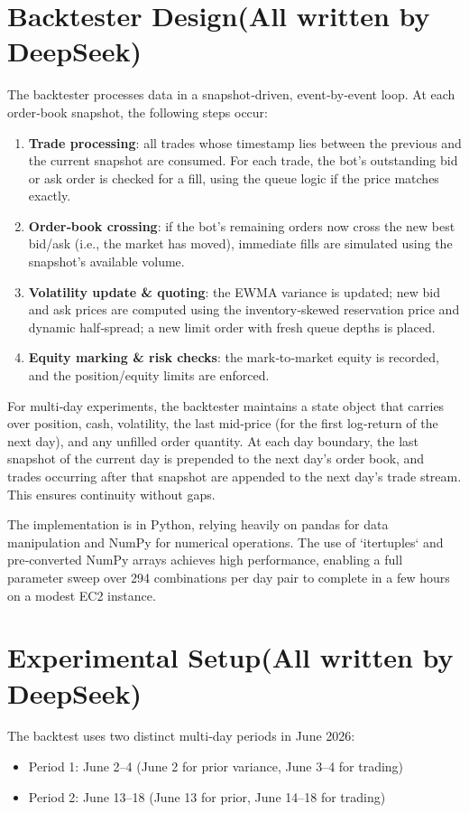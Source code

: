 \documentclass[11pt,a4paper]{article}
\begin{document}
\section{Backtester Design(All written by DeepSeek)}
The backtester processes data in a snapshot‑driven, event‑by‑event loop. At each order‑book snapshot, the following steps occur:
\begin{enumerate}[leftmargin=*]
    \item \textbf{Trade processing}: all trades whose timestamp lies between the previous and the current snapshot are consumed. For each trade, the bot's outstanding bid or ask order is checked for a fill, using the queue logic if the price matches exactly.
    \item \textbf{Order‑book crossing}: if the bot's remaining orders now cross the new best bid/ask (i.e., the market has moved), immediate fills are simulated using the snapshot's available volume.
    \item \textbf{Volatility update \& quoting}: the EWMA variance is updated; new bid and ask prices are computed using the inventory‑skewed reservation price and dynamic half‑spread; a new limit order with fresh queue depths is placed.
    \item \textbf{Equity marking \& risk checks}: the mark‑to‑market equity is recorded, and the position/equity limits are enforced.
\end{enumerate}

For multi‑day experiments, the backtester maintains a state object that carries over position, cash, volatility, the last mid‑price (for the first log‑return of the next day), and any unfilled order quantity. At each day boundary, the last snapshot of the current day is prepended to the next day's order book, and trades occurring after that snapshot are appended to the next day's trade stream. This ensures continuity without gaps.

The implementation is in Python, relying heavily on pandas for data manipulation and NumPy for numerical operations. The use of `itertuples` and pre‑converted NumPy arrays achieves high performance, enabling a full parameter sweep over 294 combinations per day pair to complete in a few hours on a modest EC2 instance.

\section{Experimental Setup(All written by DeepSeek)}
The backtest uses two distinct multi‑day periods in June 2026:
\begin{itemize}
    \item Period 1: June 2–4 (June 2 for prior variance, June 3–4 for trading)
    \item Period 2: June 13–18 (June 13 for prior, June 14–18 for trading)
\end{itemize}
\end{document}
